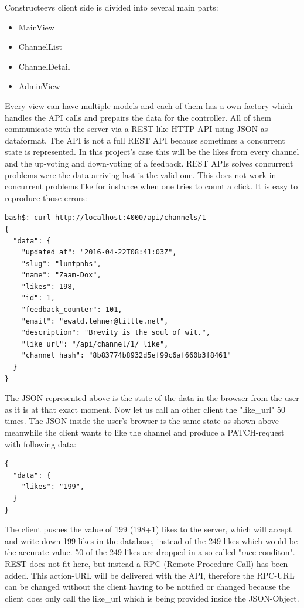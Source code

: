Constructeevs client side is divided into several main parts: 
\begin{itemize}
\item MainView
\item ChannelList
\item ChannelDetail
\item AdminView 
\end{itemize}
Every view can have multiple models and each of them has a own factory which handles the API calls and prepairs the data for the controller. 
All of them communicate with the server via a REST like HTTP-API using JSON as dataformat. The API is not a full REST API because sometimes a concurrent state is represented. In this project's case this will be the likes from every channel and the up-voting and down-voting of a feedback. REST APIs solves concurrent problems were the data arriving last is the valid one. This does not work in concurrent problems like for instance when one tries to count a click. It is easy to reproduce those errors: 

\begin{lstlisting}
bash$: curl http://localhost:4000/api/channels/1
{
  "data": {
    "updated_at": "2016-04-22T08:41:03Z",
    "slug": "luntpnbs",
    "name": "Zaam-Dox",
    "likes": 198,
    "id": 1,
    "feedback_counter": 101,
    "email": "ewald.lehner@little.net",
    "description": "Brevity is the soul of wit.",
    "like_url": "/api/channel/1/_like",
    "channel_hash": "8b83774b8932d5ef99c6af660b3f8461"
  }
}
\end{lstlisting}
The JSON represented above is the state of the data in the browser from the user as it is at that exact moment. Now let us call an other client the "like\_url" 50 times. The JSON inside the user's browser is the same state as shown above meanwhile the client wants to like the channel and produce a PATCH-request with following data:
\begin{lstlisting}
{
  "data": {
    "likes": "199",
  }
}
\end{lstlisting}
The client pushes the value of 199 (198+1) likes to the server, which will accept and write down 199 likes in the database, instead of the 249 likes which would be the accurate value. 50 of the 249 likes are dropped in a so called "race conditon". 
REST does not fit here, but instead a RPC (Remote Procedure Call) has been added. This action-URL will be delivered with the API, therefore the RPC-URL can be changed without the client having to be notified or changed because the client does only call the like\_url which is being provided inside the JSON-Object.   

